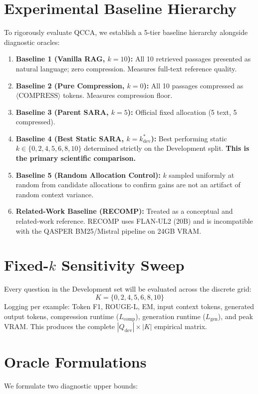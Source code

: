 \documentclass[11pt,a4paper]{article}
\begin{document}
\section{Experimental Baseline Hierarchy}
To rigorously evaluate QCCA, we establish a 5-tier baseline hierarchy alongside diagnostic oracles:
\begin{enumerate}
    \item \textbf{Baseline 1 (Vanilla RAG, $k=10$):} All 10 retrieved passages presented as natural language; zero compression. Measures full-text reference quality.
    \item \textbf{Baseline 2 (Pure Compression, $k=0$):} All 10 passages compressed as $\langle\text{COMPRESS}\rangle$ tokens. Measures compression floor.
    \item \textbf{Baseline 3 (Parent SARA, $k=5$):} Official fixed allocation (5 text, 5 compressed).
    \item \textbf{Baseline 4 (Best Static SARA, $k=k_{\text{dev}}^*$):} Best performing static $k \in \{0,2,4,5,6,8,10\}$ determined strictly on the Development split. \textbf{This is the primary scientific comparison.}
    \item \textbf{Baseline 5 (Random Allocation Control):} $k$ sampled uniformly at random from candidate allocations to confirm gains are not an artifact of random context variance.
    \item \textbf{Related-Work Baseline (RECOMP):} Treated as a conceptual and related-work reference. RECOMP uses FLAN-UL2 (20B) and is incompatible with the QASPER BM25/Mistral pipeline on 24GB VRAM.
\end{enumerate}

\section{Fixed-$k$ Sensitivity Sweep}
Every question in the Development set will be evaluated across the discrete grid:
\begin{equation*}
K = \{0, 2, 4, 5, 6, 8, 10\}
\end{equation*}
Logging per example: Token F1, ROUGE-L, EM, input context tokens, generated output tokens, compression runtime ($L_{\text{comp}}$), generation runtime ($L_{\text{gen}}$), and peak VRAM. This produces the complete $|Q_{\text{dev}}| \times |K|$ empirical matrix.

\section{Oracle Formulations}
We formulate two diagnostic upper bounds:
\end{document}
